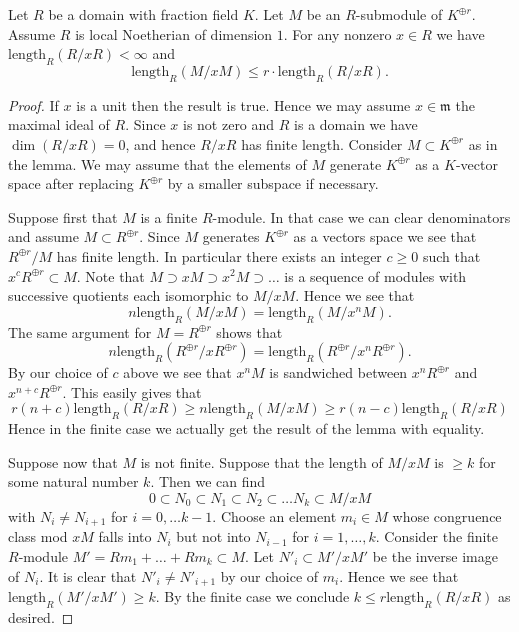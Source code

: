 \begin{lemma}
\label{lemma-finite-length}
Let $R$ be a domain with fraction field $K$.
Let $M$ be an $R$-submodule of $K^{\oplus r}$.
Assume $R$ is local Noetherian of dimension $1$.
For any nonzero $x \in R$ we have $\text{length}_R(R/xR) < \infty$
and
$$
\text{length}_R(M/xM) \leq r \cdot \text{length}_R(R/xR).
$$
\end{lemma}

\begin{proof}
If $x$ is a unit then the result is true. Hence we may assume
$x \in \mathfrak m$ the maximal ideal of $R$. Since $x$ is not
zero and $R$ is a domain we have $\dim(R/xR) = 0$, and hence
$R/xR$ has finite length. Consider $M \subset K^{\oplus r}$ as
in the lemma. We may assume that the elements of $M$ generate
$K^{\oplus r}$ as a $K$-vector space after replacing $K^{\oplus r}$
by a smaller subspace if necessary.

\medskip\noindent
Suppose first that $M$ is a finite $R$-module. In that case we can clear
denominators and assume $M \subset R^{\oplus r}$. Since
$M$ generates $K^{\oplus r}$ as a vectors space we see that
$R^{\oplus r}/M$ has finite length. In particular there exists
an integer $c \geq 0$ such that $x^cR^{\oplus r} \subset M$.
Note that $M \supset xM \supset x^2M \supset \ldots$ is a sequence of
modules with successive quotients each isomorphic to $M/xM$. Hence
we see that
$$
n \text{length}_R(M/xM) = \text{length}_R(M/x^nM).
$$
The same argument for $M = R^{\oplus r}$ shows that
$$
n \text{length}_R(R^{\oplus r}/xR^{\oplus r}) =
\text{length}_R(R^{\oplus r}/x^nR^{\oplus r}).
$$
By our choice of $c$ above we see that $x^nM$ is sandwiched between
$x^n R^{\oplus r}$ and $x^{n + c}R^{\oplus r}$. This easily gives that
$$
r(n + c) \text{length}_R(R/xR)
\geq
n \text{length}_R(M/xM)
\geq
r (n - c) \text{length}_R(R/xR)
$$
Hence in the finite case we actually get the result of the lemma with
equality.

\medskip\noindent
Suppose now that $M$ is not finite. Suppose that the length of $M/xM$ is
$\geq k$ for some natural number $k$. Then we can find
$$
0 \subset N_0 \subset N_1 \subset N_2 \subset \ldots N_k \subset M/xM
$$
with $N_i \not = N_{i + 1}$ for $i = 0, \ldots k - 1$.
Choose an element $m_i \in M$ whose congruence class mod $xM$ falls
into $N_i$ but not into $N_{i - 1}$ for $i = 1, \ldots, k$.
Consider the finite $R$-module $M' = Rm_1 + \ldots + Rm_k \subset M$.
Let $N'_i \subset M'/xM'$ be the inverse image of $N_i$.
It is clear that $N'_i \not =N'_{i + 1}$ by our choice of $m_i$.
Hence we see that $\text{length}_R(M'/xM') \geq k$. By the
finite case we conclude $k \leq r\text{length}_R(R/xR)$
as desired.
\end{proof}
